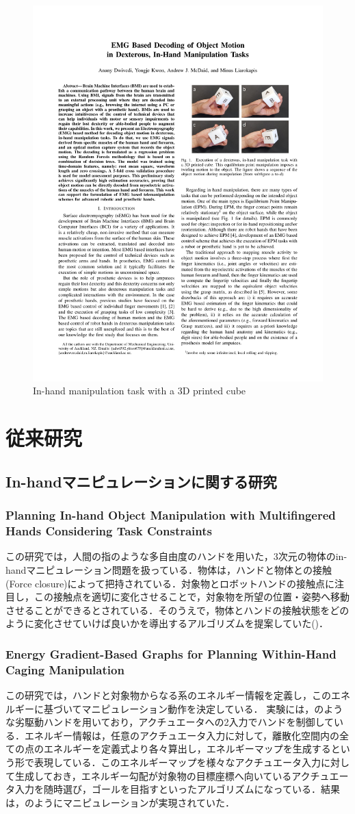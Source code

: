 \documentclass[a4paper,twoside,12pt,papersize, dvipdfmx]{iirthesis}
\begin{document}
\begin{figure}[b]
\centering
\includegraphics[width=0.35\hsize]{fig/1-introduction/Liarokapis2018_finger.pdf}
\caption{In-hand manipulation task with a 3D printed cube \cite{dwivedi2018}}
\label{fig::intro::ihm}
\end{figure}

\section{従来研究}\label{sec::intro::relatedresearch}
\subsection{In-handマニピュレーションに関する研究}
\subsubsection{Planning In-hand Object Manipulation with Multifingered Hands Considering Task Constraints \cite{hertkorn2013}}
この研究では，人間の指のような多自由度のハンドを用いた，3次元の物体のin-handマニピュレーション問題を扱っている．物体は，ハンドと物体との接触(Force closure)によって把持されている．対象物とロボットハンドの接触点に注目し，この接触点を適切に変化させることで，対象物を所望の位置・姿勢へ移動させることができるとされている．そのうえで，物体とハンドの接触状態をどのように変化させていけば良いかを導出するアルゴリズムを提案していた(\figref{})．

\subsubsection{Energy Gradient-Based Graphs for Planning Within-Hand Caging Manipulation \cite{bircher2019}}
この研究では，ハンドと対象物からなる系のエネルギー情報を定義し，このエネルギーに基づいてマニピュレーション動作を決定している．
実験には，のような劣駆動ハンドを用いており，アクチュエータへの2入力でハンドを制御している．エネルギー情報は，任意のアクチュエータ入力に対して，離散化空間内の全ての点のエネルギーを定義式より各々算出し，エネルギーマップを生成するという形で表現している．このエネルギーマップを様々なアクチュエータ入力に対して生成しておき，エネルギー勾配が対象物の目標座標へ向いているアクチュエータ入力を随時選び，ゴールを目指すといったアルゴリズムになっている．結果は，のようにマニピュレーションが実現されていた．
\end{document}
